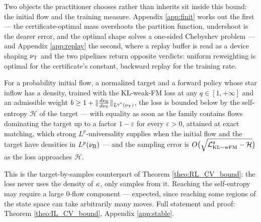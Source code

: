 Two objects the practitioner chooses rather than inherits sit inside this bound: the
initial flow and the training measure. Appendix \ref{app:finit} works out the first --- the
certificate-optimal mass overshoots the partition function, undershoot is the dearer error,
and the optimal shape solves a one-sided Chebyshev problem --- and Appendix \ref{app:replay}
the second, where a replay buffer is read as a device shaping $\nu_{\mathrm{T}}$ and the two pipelines
return opposite verdicts: uniform reweighting is optimal for the certificate's constant,
backward replay for the training rate.

\begin{theorem} \label{theo:IL_CV_bound_body}
For a probability initial flow, a normalized target and a forward policy whose star inflow
has a density, trained with the KL-weak-FM loss at any $q\in[1,+\infty]$ and an admissible
weight $b\geq1+\|\frac{d\nu_{\mathrm{B}}}{d\nu_{\mathrm{T}}}\|_{L^{q^*}(\nu_{\mathrm{T}})}$, the loss is bounded below by the self-entropy
$\mathcal H$ of the target --- with equality as soon as the family contains flows dominating
the target up to a factor $1-\varepsilon$ for every $\varepsilon>0$, attained at exact
matching, which strong $L^p$-universality supplies when the initial flow and the target have
densities in $L^p(\nu_{\mathrm{B}})$ --- and the sampling error is
$O\bigl(\sqrt{\mathcal L_{\mathrm{KL-wFM}}^q-\mathcal H}\bigr)$ as the loss approaches $\mathcal H$.
\end{theorem}
This is the target-by-samples counterpart of Theorem \ref{theo:RL_CV_bound}: the loss never
uses the density of $\kappa$, only samples from it. Reaching the self-entropy may require a large $0$-flow component --- expected, since
reaching some regions of the state space can take arbitrarily many moves. Full
statement and proof: Theorem \ref{theo:IL_CV_bound}, Appendix \ref{app:stable}.
